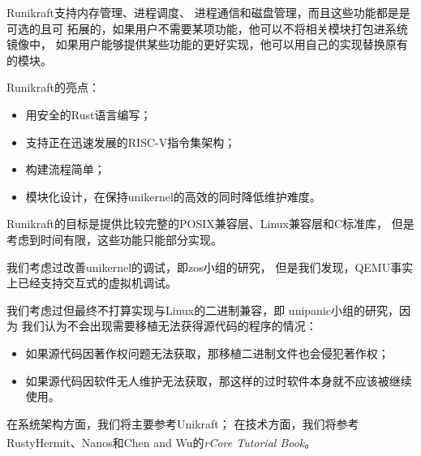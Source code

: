 \documentclass[UTF8,fontset=none,linespread=1.15]{ctexart}
\let\nosupcite\cite
\renewcommand*{\cite}[1]{\textsuperscript{\nosupcite{#1}}}
\begin{document}
Runikraft支持内存管理、进程调度、
进程通信和磁盘管理，而且这些功能都是是可选的且可
拓展的，如果用户不需要某项功能，他可以不将相关模块打包进系统镜像中，
如果用户能够提供某些功能的更好实现，他可以用自己的实现替换原有的模块。

Runikraft的亮点：
\begin{itemize}
\item 用安全的Rust语言编写；
\item 支持正在迅速发展的RISC-V指令集架构；
\item 构建流程简单；
\item 模块化设计，在保持unikernel的高效的同时降低维护难度。
\end{itemize}

Runikraft的目标是提供比较完整的POSIX兼容层、Linux兼容层和C标准库，
但是考虑到时间有限，这些功能只能部分实现。


我们考虑过改善unikernel的调试，即zos小组的研究，
但是我们发现，QEMU事实上已经支持交互式的虚拟机调试。

我们考虑过但最终不打算实现与Linux的二进制兼容，即
unipanic小组的研究，因为
我们认为不会出现需要移植无法获得源代码的程序的情况：
\begin{itemize}
\item 如果源代码因著作权问题无法获取，那移植二进制文件也会侵犯著作权；
\item 如果源代码因软件无人维护无法获取，那这样的过时软件本身就不应该被继续使用。
\end{itemize}

在系统架构方面，我们将主要参考Unikraft；
在技术方面，我们将参考RustyHermit、Nanos和Chen and Wu的\textit{rCore Tutorial Book}\cite{bib:rcore-os}。
\end{document}

